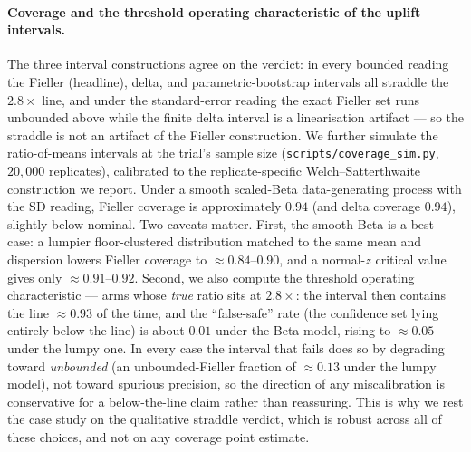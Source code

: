 \documentclass{article}
\begin{document}
\paragraph{Coverage and the threshold operating characteristic of the uplift intervals.}
The three interval constructions agree on the verdict: in every bounded reading the Fieller
(headline), delta, and parametric-bootstrap intervals all straddle the $2.8\times$ line, and
under the standard-error reading the exact Fieller set runs unbounded above while the finite
delta interval is a linearisation artifact --- so the straddle is not an artifact of the
Fieller construction. We further simulate the ratio-of-means intervals at the trial's sample
size (\texttt{scripts/coverage\_sim.py}, $20{,}000$ replicates), calibrated to the
replicate-specific Welch--Satterthwaite construction we report. Under a smooth scaled-Beta
data-generating process with the SD reading, Fieller coverage is approximately
$0.94$ (and delta coverage $0.94$), slightly below nominal. Two caveats matter.
First, the smooth Beta is a best case: a lumpier floor-clustered distribution matched to the
same mean and dispersion lowers Fieller coverage to $\approx 0.84$--$0.90$, and a normal-$z$
critical value gives only $\approx 0.91$--$0.92$. Second, we also compute the
threshold operating characteristic --- arms whose \emph{true} ratio sits at $2.8\times$: the
interval then contains the line $\approx 0.93$ of the time, and the ``false-safe'' rate (the
confidence set lying entirely below the line) is about $0.01$ under the Beta model,
rising to $\approx 0.05$ under the lumpy one. In every case the interval that fails does so
by degrading toward \emph{unbounded} (an unbounded-Fieller fraction of $\approx 0.13$ under
the lumpy model), not toward spurious precision, so the direction of any miscalibration is
conservative for a below-the-line claim rather than reassuring. This is why we rest the case
study on the qualitative straddle verdict, which is robust across all of these choices, and
not on any coverage point estimate.
\end{document}
